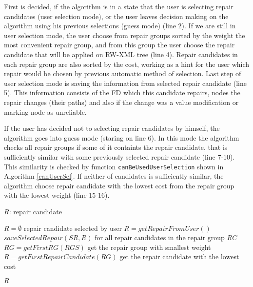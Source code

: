 First is decided, if the algorithm is in a state that the user is selecting repair candidates (user selection mode), or the user leaves decision making on the algorithm using his previous selections (guess mode) (line 2). If we are still in user selection mode, the user choose from repair groups sorted by the weight the most convenient repair group, and from this group the user choose the repair candidate that will be applied on RW-XML tree (line 4). Repair candidates in each repair group are also sorted by the cost, working as a hint for the user which repair would be chosen by previous automatic method of selection. Last step of user selection mode is saving the information from selected repair candidate (line 5). This information consists of the FD which this candidate repairs, nodes the repair changes (their paths) and also if the change was a value modification or marking node as unreliable.

If the user has decided not to selecting repair candidates by himself, the algorithm goes into guess mode (staring on line 6). In this mode the algorithm checks all repair groups if some of it containts the repair candidate, that is sufficiently similar with some previously selected repair candidate (line 7-10). This similarity is checked by function \texttt{canBeUsedUserSelection} shown in Algorithm \ref{canUserSel}. If neither of candidates is sufficiently similar, the algorithm choose repair candidate with the lowest cost from the repair group with the lowest weight (line 15-16).

\begin{algorithm}[H]
\caption{$selectRepairByUser(RGS, SR, t)$}
\label{selectUser}
\begin{algorithmic}[1]
\ENSURE $R$: repair candidate

\STATE $R = \emptyset$
    \STATE \COMMENT repair candidate selected by user
    \STATE $R = getRepairFromUser()$
    \STATE $saveSelectedRepair(SR, R)$
\ELSE
        \STATE \COMMENT for all repair candidates in the repair group
                \RETURN $RC$
            \ENDIF
        \ENDFOR
    \ENDFOR
    \STATE $RG = getFirstRG(RGS)$ \COMMENT get the repair group with smallest weight
    \STATE $R = getFirstRepairCandidate(RG)$ \COMMENT get the repair candidate with the lowest cost
\ENDIF

\RETURN $R$
\end{algorithmic}
\end{algorithm}


